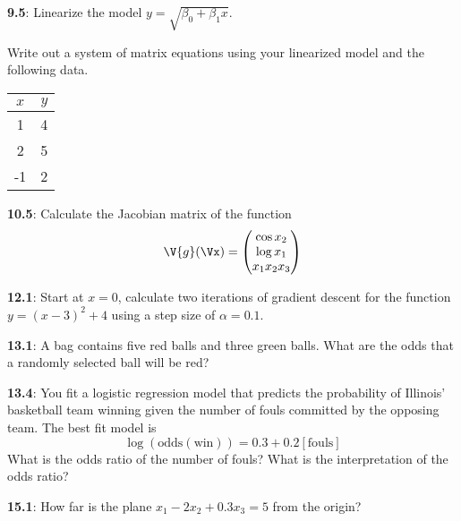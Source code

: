 \documentclass[pal,wide,12pt]{pajarticle}
\newenvironment{problem}[1]{\noindent\textbf{#1}:}{\newpage}
\begin{document}
\begin{problem}{9.5}
Linearize the model $y = \sqrt{\beta_0 + \beta_1x}$.

\vspace{3in}
\noindent
Write out a system of matrix equations using your linearized model and the following data.
\begin{center}
	\begin{tabular}{cc}
		\toprule
		$x$ & $y$ \\
		\midrule
		1 & 4 \\
		2 & 5 \\
		-1 & 2 \\
		\bottomrule	
	\end{tabular}
\end{center}
\end{problem}

\begin{problem}{10.5}
Calculate the Jacobian matrix of the function
\[ \V{g}(\Vx) = \begin{pmatrix} \cos x_2 \\ \log x_1 \\ x_1 x_2 x_3 \end{pmatrix} \]
\end{problem}

\begin{problem}{12.1}
Start at $x=0$, calculate two iterations of gradient descent for the function $y = (x - 3)^2 + 4$ using a step size of $\alpha=0.1$.
\end{problem}

\begin{problem}{13.1}
A bag contains five red balls and three green balls. What are the odds that a randomly selected ball will be red?
\end{problem}

\begin{problem}{13.4}
You fit a logistic regression model that predicts the probability of Illinois' basketball team winning given the number of fouls committed by the opposing team. The best fit model is
\[ \log(\mathrm{odds}(\text{win})) = 0.3 + 0.2[\text{fouls}] \]
What is the odds ratio of the number of fouls? What is the interpretation of the odds ratio?
\end{problem}

\begin{problem}{15.1}
How far is the plane $x_1 -2x_2 + 0.3x_3 = 5$ from the origin?
\end{problem}
\end{document}
